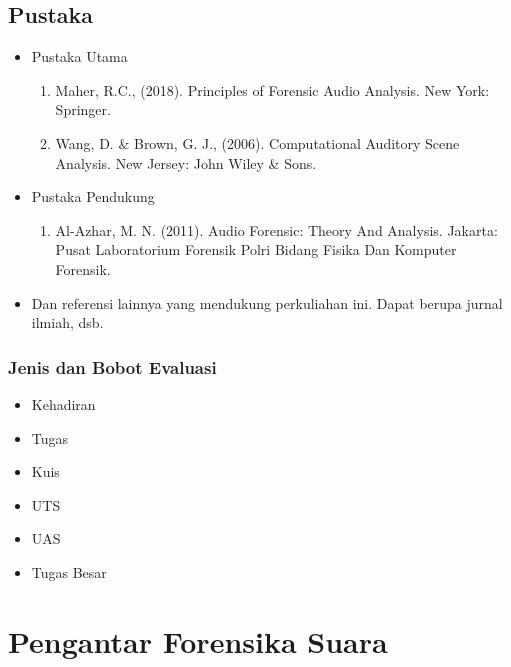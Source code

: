 \documentclass[pdflatex,compress]{beamer}
\begin{document}
\subsection{Pustaka}
\begin{frame}
	\begin{itemize}
		\frametitle{Pustaka}
		\item Pustaka Utama
		\begin{enumerate}
			\item Maher, R.C., (2018). Principles of Forensic Audio Analysis. New York: Springer.
			\item Wang, D. \& Brown, G. J., (2006). Computational Auditory Scene Analysis. New Jersey: John Wiley \& Sons.
		\end{enumerate}
		\item Pustaka Pendukung
		\begin{enumerate}
			\item Al-Azhar, M. N. (2011). Audio Forensic: Theory And Analysis. Jakarta: Pusat Laboratorium Forensik Polri
			Bidang Fisika Dan Komputer Forensik.
		\end{enumerate}
		\item Dan referensi lainnya yang mendukung perkuliahan ini. Dapat berupa jurnal ilmiah, dsb.
	\end{itemize}
\end{frame}

\begin{frame}
	\frametitle{Jenis dan Bobot Evaluasi}
	\begin{itemize}
		\item Kehadiran
		\item Tugas
		\item Kuis
		\item UTS
		\item UAS
		\item Tugas Besar
	\end{itemize}
\end{frame}


\section{Pengantar Forensika Suara}
\end{document}
